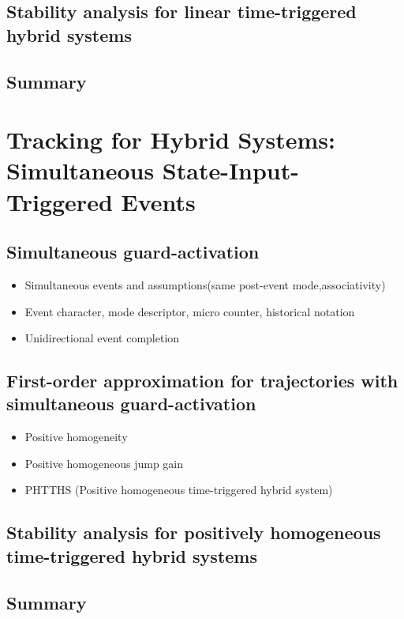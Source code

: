\documentclass[../DC2017114Bouma.tex]{subfiles}
\begin{document}
\section{Stability analysis for linear time-triggered hybrid systems}

\section{Summary}

\cleartooddpage
\chapter{Tracking for Hybrid Systems: Simultaneous State-Input-Triggered Events}\label{ch:simult}
\cite{Rijnen2018}
\section{Simultaneous guard-activation}
\begin{itemize}
\item Simultaneous events and assumptions(same post-event mode,associativity)
\item Event character, mode descriptor, micro counter, historical notation
\item Unidirectional event completion
\end{itemize}
%
%
%
%
%
%
%
%
%
\section{First-order approximation for trajectories with simultaneous guard-activation}
\begin{itemize}
\item Positive homogeneity
\item Positive homogeneous jump gain
\item PHTTHS (Positive homogeneous time-triggered hybrid system)
\end{itemize}
%
%
%
%
%
%
\section{Stability analysis for positively homogeneous time-triggered hybrid systems}

\section{Summary}
\end{document}
